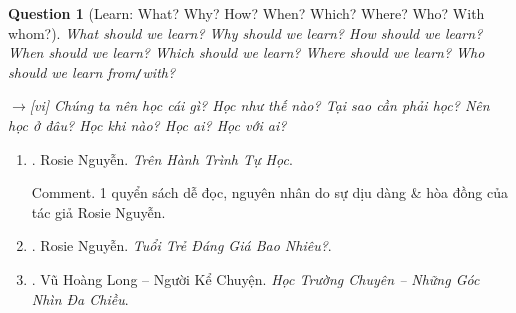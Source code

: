 \documentclass[12pt,twoside]{book}
\newtheorem{question}{Question}
\begin{document}
\begin{question}[Learn: What? Why? How? When? Which? Where? Who? With whom?]
	What should we learn? Why should we learn? How should we learn? When should we learn? Which should we learn? Where should we learn? Who should we learn from{\tt/}with?
	
	{\sf[en]$\to$[vi]} Chúng ta nên học cái gì? Học như thế nào? Tại sao cần phải học? Nên học ở đâu? Học khi nào? Học ai? Học với ai?
\end{question}
\begin{enumerate}
	\item \cite{Rosie_self_study}. {\sc Rosie Nguyễn}. {\it Trên Hành Trình Tự Học}.
	
	{\sf Comment.} 1 quyển sách dễ đọc, nguyên nhân do sự dịu dàng \& hòa đồng của tác giả {\sc Rosie Nguyễn}.
	\item \cite{Rosie_youth}. {\sc Rosie Nguyễn}. {\it Tuổi Trẻ Đáng Giá Bao Nhiêu?}.
	\item \cite{Long2021}. {\sc Vũ Hoàng Long -- Người Kể Chuyện}. {\it Học Trường Chuyên -- Những Góc Nhìn Đa Chiều}.
	

\end{enumerate}
\end{document}
